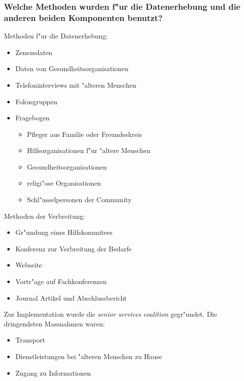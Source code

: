 \subsubsection{Welche Methoden wurden f"ur die Datenerhebung und die anderen beiden Komponenten benutzt?}
Methoden f"ur die Datenerhebung:
\label{sec:verbreit}
\begin{itemize}
        \item Zensusdaten
        \item Daten von Gesundheitsorganisationen
        \item Telefoninterviews mit "alteren Menschen
        \item Fokusgruppen
        \item Fragebogen
                \begin{itemize}
                        \item Pfleger aus Familie oder Freundeskreis
                        \item Hilfsorganisationen f"ur "altere Menschen
                        \item Gesundheitsorganisationen
                        \item religi"ose Organisationen
                        \item Schl"usselpersonen der Community
                \end{itemize}
\end{itemize}

\noindent Methoden der Verbreitung:
\begin{itemize}
        \item Gr"undung eines Hilfskommitees
        \item Konferenz zur Verbreitung der Bedarfe
        \item Webseite
        \item Vortr"age auf Fachkonferenzen
        \item Journal Artikel und Abschlussbericht
\end{itemize}

\noindent Zur Implementation wurde die \emph{senior services coalition} gegr"undet. Die dringendsten Massnahmen waren:
\begin{itemize}
        \item Transport 
        \item Dienstleistungen bei "alteren Menschen zu Hause
        \item Zugang zu Informationen
\end{itemize}

